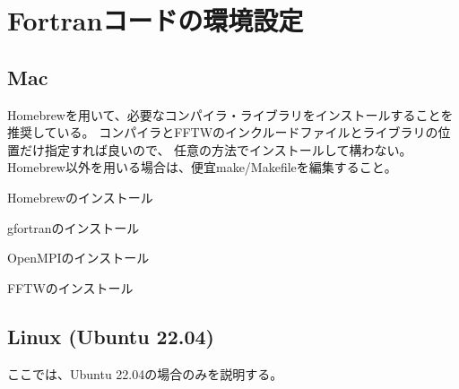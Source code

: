 \documentclass[letterpaper,10pt,dvipdfmx,report]{sphinxmanual}
\begin{document}
\section{Fortranコードの環境設定}
\label{\detokenize{environment:fortran}}

\subsection{Mac}
\label{\detokenize{environment:mac}}
\sphinxAtStartPar
Homebrewを用いて、必要なコンパイラ・ライブラリをインストールすることを推奨している。
コンパイラとFFTWのインクルードファイルとライブラリの位置だけ指定すれば良いので、
任意の方法でインストールして構わない。Homebrew以外を用いる場合は、便宜make/Makefileを編集すること。

\sphinxAtStartPar
Homebrewのインストール

\begin{sphinxVerbatim}[commandchars=\\\{\}]
  
\end{sphinxVerbatim}

\sphinxAtStartPar
gfortranのインストール

\begin{sphinxVerbatim}[commandchars=\\\{\}]
  
\end{sphinxVerbatim}

\sphinxAtStartPar
OpenMPIのインストール

\begin{sphinxVerbatim}[commandchars=\\\{\}]
  
\end{sphinxVerbatim}

\sphinxAtStartPar
FFTWのインストール

\begin{sphinxVerbatim}[commandchars=\\\{\}]
  
\end{sphinxVerbatim}


\subsection{Linux (Ubuntu 22.04)}
\label{\detokenize{environment:linux-ubuntu-22-04}}
\sphinxAtStartPar
ここでは、Ubuntu 22.04の場合のみを説明する。
\end{document}
